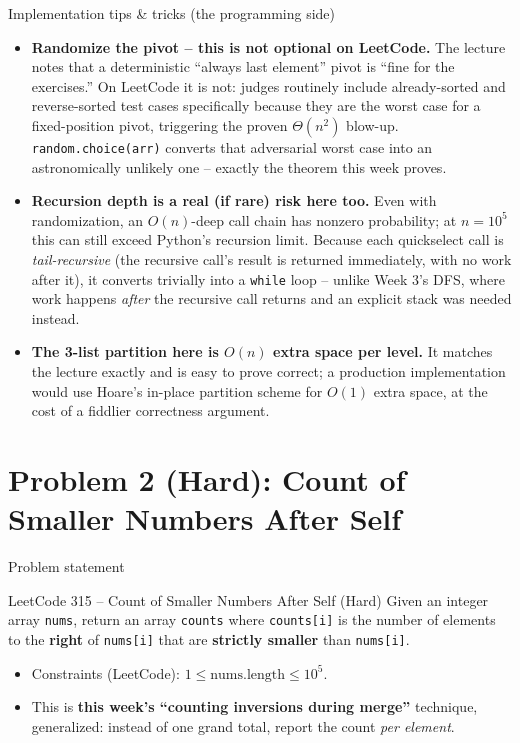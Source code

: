 \documentclass[11pt,aspectratio=169]{beamer}
\begin{document}
\begin{frame}{Implementation tips \& tricks (the programming side)}
  \small
  \begin{itemize}
    \item \textbf{Randomize the pivot -- this is not optional on LeetCode.} The lecture
    notes that a deterministic ``always last element'' pivot is ``fine for the exercises.''
    On LeetCode it is not: judges routinely include already-sorted and reverse-sorted test
    cases specifically because they are the worst case for a fixed-position pivot,
    triggering the proven $\Theta(n^2)$ blow-up. \texttt{random.choice(arr)} converts that
    adversarial worst case into an astronomically unlikely one -- exactly the theorem this
    week proves.
    \item \textbf{Recursion depth is a real (if rare) risk here too.} Even with
    randomization, an $O(n)$-deep call chain has nonzero probability; at $n=10^5$ this can
    still exceed Python's recursion limit. Because each quickselect call is
    \emph{tail-recursive} (the recursive call's result is returned immediately, with no
    work after it), it converts trivially into a \texttt{while} loop -- unlike Week 3's DFS,
    where work happens \emph{after} the recursive call returns and an explicit stack was
    needed instead.
    \item \textbf{The 3-list partition here is $O(n)$ extra space per level.} It matches
    the lecture exactly and is easy to prove correct; a production implementation would use
    Hoare's in-place partition scheme for $O(1)$ extra space, at the cost of a fiddlier
    correctness argument.
  \end{itemize}
\end{frame}

\section{Problem 2 (Hard): Count of Smaller Numbers After Self}

\begin{frame}{Problem statement}
  \begin{block}{LeetCode 315 -- Count of Smaller Numbers After Self (\textcolor{red!60!black}{Hard})}
    Given an integer array \texttt{nums}, return an array \texttt{counts} where
    \texttt{counts[i]} is the number of elements to the \textbf{right} of \texttt{nums[i]}
    that are \textbf{strictly smaller} than \texttt{nums[i]}.
  \end{block}
  \begin{itemize}
    \item Constraints (LeetCode): $1 \le \text{nums.length} \le 10^5$.
    \item This is \textbf{this week's ``counting inversions during merge''} technique,
    generalized: instead of one grand total, report the count \emph{per element}.
  \end{itemize}
\end{frame}
\end{document}
